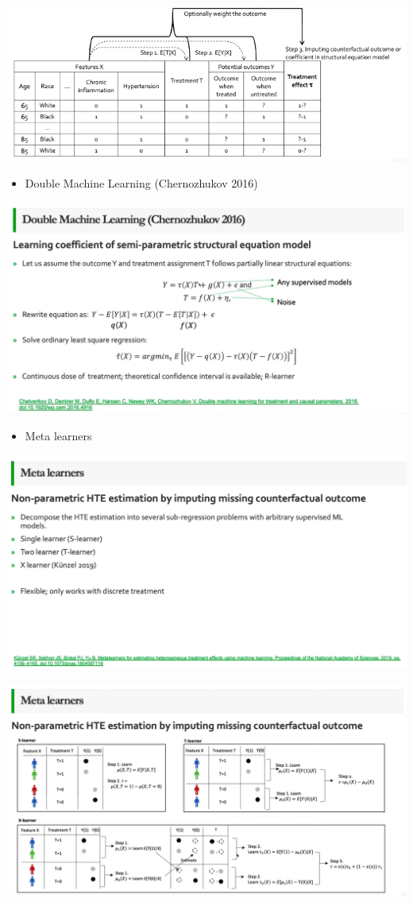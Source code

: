 \documentclass[
]{book}
\providecommand{\tightlist}{%
  \setlength{\itemsep}{0pt}\setlength{\parskip}{0pt}}
\theoremstyle{definition}
\theoremstyle{definition}
\theoremstyle{definition}
\theoremstyle{definition}
\theoremstyle{remark}
\begin{document}
\includegraphics{figures/12.png}

\begin{itemize}
\tightlist
\item
  Double Machine Learning (Chernozhukov 2016)
\end{itemize}

\includegraphics{figures/13.png}

\begin{itemize}
\tightlist
\item
  Meta learners
\end{itemize}

\includegraphics{figures/14.png}

\includegraphics{figures/15.png}
\end{document}
